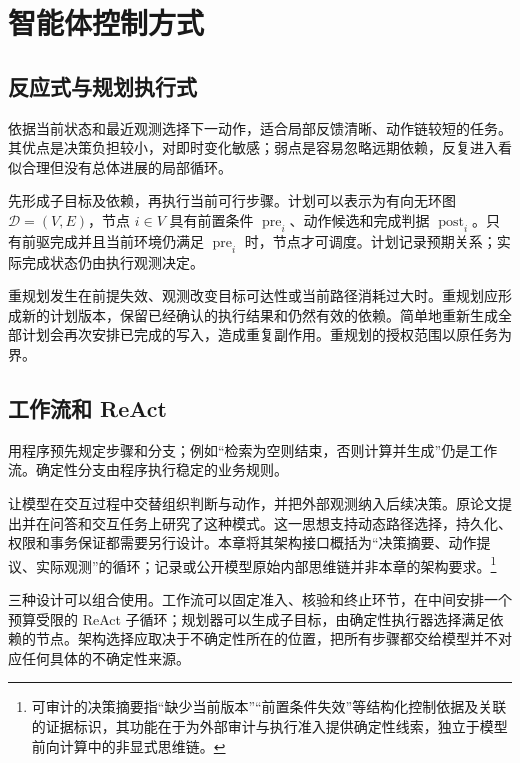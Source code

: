 \documentclass[../textbook.tex]{subfiles}
\begin{document}
\section{智能体控制方式}

\subsection{反应式与规划执行式}
依据当前状态和最近观测选择下一动作，适合局部反馈清晰、动作链较短的任务。其优点是决策负担较小，对即时变化敏感；弱点是容易忽略远期依赖，反复进入看似合理但没有总体进展的局部循环。

先形成子目标及依赖，再执行当前可行步骤。计划可以表示为有向无环图 $\mathcal D=(V,E)$，节点 $i\in V$ 具有前置条件 $\operatorname{pre}_i$、动作候选和完成判据 $\operatorname{post}_i$。只有前驱完成并且当前环境仍满足 $\operatorname{pre}_i$ 时，节点才可调度。计划记录预期关系；实际完成状态仍由执行观测决定。

重规划发生在前提失效、观测改变目标可达性或当前路径消耗过大时。重规划应形成新的计划版本，保留已经确认的执行结果和仍然有效的依赖。简单地重新生成全部计划会再次安排已完成的写入，造成重复副作用。重规划的授权范围以原任务为界。

\subsection{工作流和 ReAct}
用程序预先规定步骤和分支；例如“检索为空则结束，否则计算并生成”仍是工作流。确定性分支由程序执行稳定的业务规则。

让模型在交互过程中交替组织判断与动作，并把外部观测纳入后续决策。原论文提出并在问答和交互任务上研究了这种模式\cite{yao2023react}。这一思想支持动态路径选择，持久化、权限和事务保证都需要另行设计。本章将其架构接口概括为“决策摘要、动作提议、实际观测”的循环；记录或公开模型原始内部思维链并非本章的架构要求。\footnote{可审计的决策摘要指“缺少当前版本”“前置条件失效”等结构化控制依据及关联的证据标识，其功能在于为外部审计与执行准入提供确定性线索，独立于模型前向计算中的非显式思维链。}

三种设计可以组合使用。工作流可以固定准入、核验和终止环节，在中间安排一个预算受限的 ReAct 子循环；规划器可以生成子目标，由确定性执行器选择满足依赖的节点。架构选择应取决于不确定性所在的位置，把所有步骤都交给模型并不对应任何具体的不确定性来源。
\end{document}
